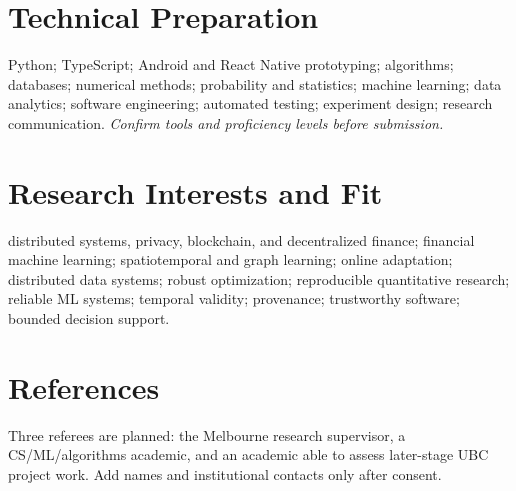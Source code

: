 \documentclass[11pt]{article}
\begin{document}
\section*{Technical Preparation}
Python; TypeScript; Android and React Native prototyping; algorithms; databases; numerical methods; probability and statistics; machine learning; data analytics; software engineering; automated testing; experiment design; research communication. \textit{Confirm tools and proficiency levels before submission.}

\section*{Research Interests and Fit}
distributed systems, privacy, blockchain, and decentralized finance; financial machine learning; spatiotemporal and graph learning; online adaptation; distributed data systems; robust optimization; reproducible quantitative research; reliable ML systems; temporal validity; provenance; trustworthy software; bounded decision support.

\section*{References}
Three referees are planned: the Melbourne research supervisor, a CS/ML/algorithms academic, and an academic able to assess later-stage UBC project work. Add names and institutional contacts only after consent.
\end{document}
